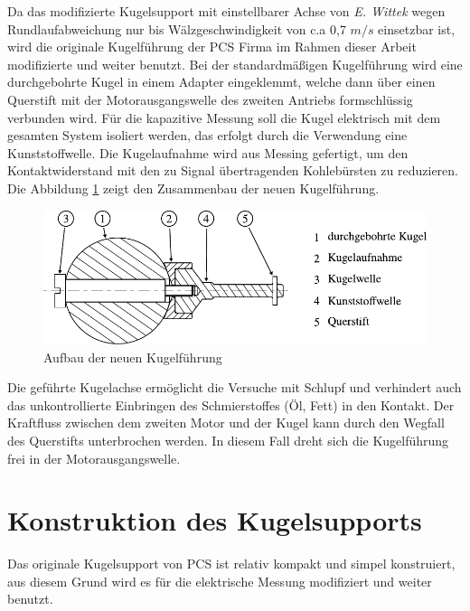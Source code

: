 Da das modifizierte Kugelsupport mit einstellbarer Achse von \textit{E. Wittek} \cite{wittek_2007} wegen Rundlaufabweichung nur bis Wälzgeschwindigkeit von c.a 0,7 $m/s$ einsetzbar ist, wird die originale Kugelführung der PCS Firma im Rahmen dieser Arbeit modifizierte und weiter benutzt.
Bei der standardmäßigen Kugelführung wird eine durchgebohrte Kugel in einem Adapter eingeklemmt, welche dann über einen Querstift mit der Motorausgangswelle des zweiten Antriebs formschlüssig verbunden wird.
Für die kapazitive Messung soll die Kugel elektrisch mit dem gesamten System isoliert werden, das erfolgt durch die Verwendung eine Kunststoffwelle.
Die Kugelaufnahme wird aus Messing gefertigt, um den Kontaktwiderstand mit den zu Signal übertragenden Kohlebürsten zu reduzieren.
Die Abbildung \ref{fig:aufbau_der_neuen_kugelfuehrung} zeigt den Zusammenbau der neuen Kugelführung.
\begin{figure}[htb]
    \centering
    \includegraphics[]{./images/durchgebohrte_kugel.pdf}
    \caption{Aufbau der neuen Kugelführung}
    \label{fig:aufbau_der_neuen_kugelfuehrung}
\end{figure}
%

Die geführte Kugelachse ermöglicht die Versuche mit Schlupf und verhindert auch das unkontrollierte Einbringen des Schmierstoffes (Öl, Fett) in den Kontakt.
Der Kraftfluss zwischen dem zweiten Motor und der Kugel kann durch den Wegfall des Querstifts unterbrochen werden.
In diesem Fall dreht sich die Kugelführung frei in der Motorausgangswelle.

\section{Konstruktion des Kugelsupports}
\label{sec:konstruktion_des_kugelsupports}

Das originale Kugelsupport von PCS ist relativ kompakt und simpel konstruiert, aus diesem Grund wird es für die elektrische Messung modifiziert und weiter benutzt.

